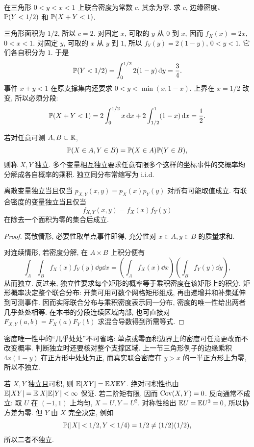 \begin{example}
在三角形 $0<y<x<1$ 上联合密度为常数 $c$, 其余为零. 求 $c$, 边缘密度、$\mathbb P(Y<1/2)$ 和 $\mathbb P(X+Y<1)$.
\end{example}
\begin{solution}
三角形面积为 $1/2$, 所以 $c=2$. 对固定 $x$, 可取的 $y$ 从 $0$ 到 $x$, 因而
$f_X(x)=2x$, $0<x<1$. 对固定 $y$, 可取的 $x$ 从 $y$ 到 $1$, 所以 $f_Y(y)=2(1-y)$, $0<y<1$. 它们各自积分为 $1$. 于是
\[
 \mathbb P(Y<1/2)=\int_0^{1/2}2(1-y)\,\mathrm d y=\frac34.
\]
事件 $x+y<1$ 在原支撑集内还要求 $0<y<\min(x,1-x)$. 上界在 $x=1/2$ 改变, 所以必须分段:
\[
 \mathbb P(X+Y<1)=2\int_0^{1/2}x\,\mathrm d x+
              2\int_{1/2}^1(1-x)\,\mathrm d x=\frac12.
\]
\end{solution}


\begin{definition}[随机变量独立]
若对任意可测 $A,B\subset\mathbb R$,
\[
 \mathbb P(X\in A,Y\in B)=\mathbb P(X\in A)\mathbb P(Y\in B),
\]
则称 $X,Y$ 独立. 多个变量相互独立要求任意有限多个这样的坐标事件的交概率均分解成各自概率的乘积. 独立同分布常缩写为 i.i.d.
\end{definition}

\begin{proposition}[质量与密度的分解]
离散变量独立当且仅当 $p_{X,Y}(x,y)=p_X(x)p_Y(y)$ 对所有可能取值成立. 有联合密度的变量独立当且仅当
\[
 f_{X,Y}(x,y)=f_X(x)f_Y(y)
\]
在除去一个面积为零的集合后成立.
\end{proposition}
\begin{proof}
离散情形, 必要性取单点事件即得, 充分性对 $x\in A,y\in B$ 的质量求和.

对连续情形, 若密度分解, 在 $A\times B$ 上积分便有
\[
 \int_A\int_B f_X(x)f_Y(y)\dd y\dd x
 =\left(\int_Af_X(x)\dd x\right)
  \left(\int_Bf_Y(y)\dd y\right),
\]
从而独立. 反过来, 独立性要求每个矩形的概率等于乘积密度在该矩形上的积分. 矩形概率决定整个联合分布: 开集可用可数个网格矩形组成, 再由递增并和补集延伸到可测事件. 因而实际联合分布与乘积密度表示同一分布, 密度的唯一性给出两者几乎处处相等. 在本书的分段连续区域内部, 也可直接对
$F_{X,Y}(a,b)=F_X(a)F_Y(b)$ 求混合导数得到所需等式.
\end{proof}

密度唯一性中的“几乎处处”不可省略: 单点或零面积边界上的密度可任意更改而不改变概率. 判断独立时还要核对整个支撑区域. 上一节三角形例子的边缘乘积 $4x(1-y)$ 在正方形中处处为正, 而真实联合密度在 $y>x$ 的一半正方形上为零, 所以不独立.

若 $X,Y$ 独立且可积, 则 $\mathbb E[XY]=\mathbb E X\mathbb E Y$. 绝对可积性也由
$\mathbb E|XY|=\mathbb E|X|\mathbb E|Y|<\infty$ 保证. 若二阶矩有限, 因而 $\operatorname{Cov}(X,Y)=0$. 反向通常不成立: 取 $U$ 在 $(-1,1)$ 上均匀, $X=U,Y=U^2$. 对称性给出 $\mathbb E U=\mathbb E U^3=0$, 所以协方差为零. 但 $Y$ 由 $X$ 完全决定, 例如
\[
 \mathbb P(|X|<1/2,Y<1/4)=1/2
 \ne(1/2)(1/2),
\]
所以二者不独立.


